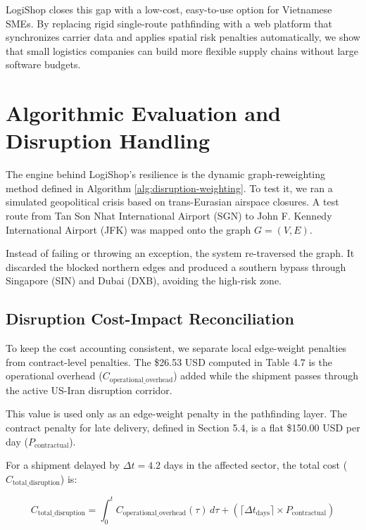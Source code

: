 LogiShop closes this gap with a low-cost, easy-to-use option for Vietnamese SMEs. By replacing rigid single-route pathfinding with a web platform that synchronizes carrier data and applies spatial risk penalties automatically, we show that small logistics companies can build more flexible supply chains without large software budgets.

\section{Algorithmic Evaluation and Disruption Handling}

The engine behind LogiShop's resilience is the dynamic graph-reweighting method defined in Algorithm \ref{alg:disruption-weighting}. To test it, we ran a simulated geopolitical crisis based on trans-Eurasian airspace closures. A test route from Tan Son Nhat International Airport (SGN) to John F. Kennedy International Airport (JFK) was mapped onto the graph $G=(V,E)$.

Instead of failing or throwing an exception, the system re-traversed the graph. It discarded the blocked northern edges and produced a southern bypass through Singapore (SIN) and Dubai (DXB), avoiding the high-risk zone.

\subsection{Disruption Cost-Impact Reconciliation}

To keep the cost accounting consistent, we separate local edge-weight penalties from contract-level penalties. The \$26.53 USD computed in Table 4.7 is the operational overhead ($C_{\text{operational\_overhead}}$) added while the shipment passes through the active US-Iran disruption corridor.

This value is used only as an edge-weight penalty in the pathfinding layer. The contract penalty for late delivery, defined in Section 5.4, is a flat \$150.00 USD per day ($P_{\text{contractual}}$).

For a shipment delayed by $\Delta t = 4.2$ days in the affected sector, the total cost ($C_{\text{total\_disruption}}$) is:

\begin{equation}
C_{\text{total\_disruption}} = \int_{0}^{t} C_{\text{operational\_overhead}}(\tau) \, d\tau + \left( \lceil \Delta t_{\text{days}} \rceil \times P_{\text{contractual}} \right)
\end{equation}

